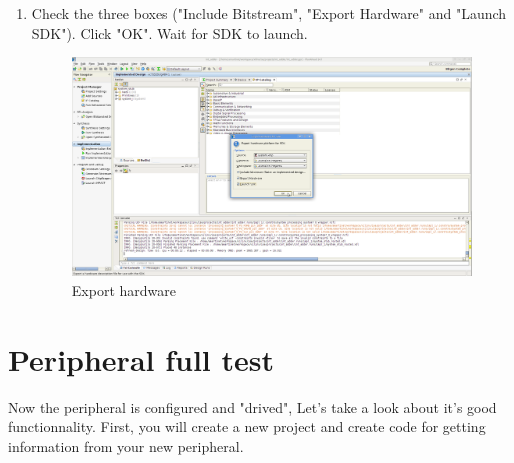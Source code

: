 \documentclass{article}
\begin{document}
\begin{enumerate}
		\item Check the three boxes ("Include Bitstream", "Export Hardware" and
				"Launch SDK"). Click "OK". Wait for SDK to launch.
	\begin{figure}
	\includegraphics[scale=0.25]{pictures/ExportHardware.png}
	\caption{Export hardware}
	\end{figure}
		\end{enumerate}

	\section{Peripheral full test}
		Now the peripheral is configured and "drived", 
		Let's take a look about it's good functionnality.
		First, you will create a new project and create code for getting
		information from your new peripheral.
\end{document}
